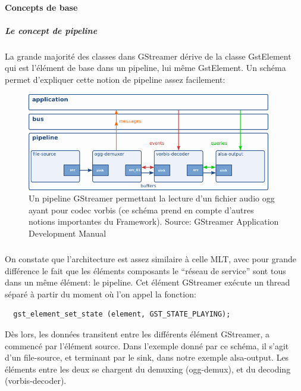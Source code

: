 \paragraph{Concepts de base}

\subparagraph{Le concept de pipeline}

\subparagraph{}

La grande majorité des classes dans GStreamer dérive de la classe
GstElement qui est l'élément de base dans un pipeline, lui même
GstElement. Un schéma permet d'expliquer cette notion de pipeline
assez facilement:

\begin{figure} [H]

  \begin{center}

    \includegraphics[width=0.95\textwidth]{images/gstpipeline}

  \end{center}

  \caption{Un pipeline GStreamer permettant la lecture d'un fichier
  audio ogg
    ayant pour codec vorbis (ce schéma prend en compte d'autres notions
    importantes du Framework). Source: GStreamer Application Development
    Manual}

  \label{Yes}

\end{figure}

\subparagraph{}

On constate que l'architecture est assez similaire à celle
MLT, avec pour grande différence le fait que les éléments
composants le ``réseau de service'' sont tous dans un même élément:
le pipeline. Cet élément GStreamer exécute un thread séparé à
partir du moment où l'on appel la fonction:

\begin{lstlisting}
  gst_element_set_state (element, GST_STATE_PLAYING);
\end{lstlisting}


Dès lors, les données transitent entre les différents élément
GStreamer, a commencé par l'élément source. Dans l'exemple donné
par ce schéma, il s'agit d'un file-source, et terminant par le sink,
dans notre exemple alsa-output. Les éléments entre les deux se chargent
du demuxing (ogg-demux), et du decoding (vorbis-decoder).

